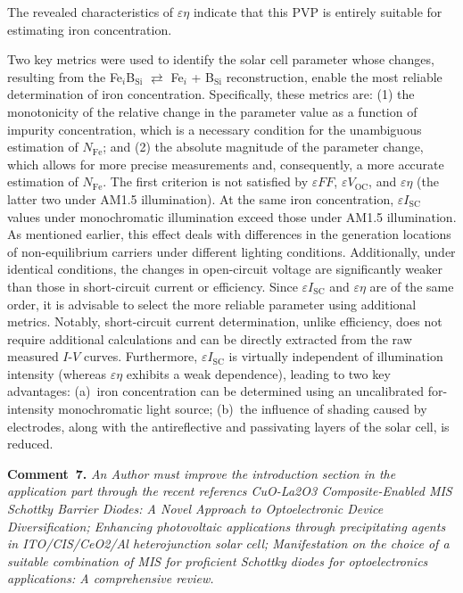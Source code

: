 \documentclass[a4paper,fleqn]{cas-sc}
\begin{document}
\begin{mdframed}
The revealed characteristics of $\varepsilon \eta$ indicate that this PVP
is entirely suitable for estimating iron concentration.

\textcolor[rgb]{1.00,0.07,0.00}{Two key metrics were used to identify the solar cell parameter whose changes,
resulting from the Fe$_i$B$_\mathrm{Si}$ $\rightleftarrows$ Fe$_i$ + B$_\mathrm{Si}$ reconstruction,
enable the most reliable determination of iron concentration.
Specifically, these metrics are:
(1) the monotonicity of the relative change in the parameter value as a function of impurity concentration,
which is a necessary condition for the unambiguous estimation of $N_\mathrm{Fe}$;
and (2) the absolute magnitude of the parameter change, which allows for more precise measurements and,
consequently, a more accurate estimation of $N_\mathrm{Fe}$.
The first criterion is not satisfied by $\varepsilon F\!F$, $\varepsilon V_\mathrm{OC}$, and $\varepsilon \eta$
(the latter two under AM1.5 illumination).
At the same iron concentration, $\varepsilon I_\mathrm{SC}$ values under monochromatic illumination exceed those under AM1.5 illumination.
As mentioned earlier, this effect deals with differences in the generation locations
of non-equilibrium carriers under different lighting conditions.
Additionally, under identical conditions, the changes in open-circuit voltage are significantly weaker
than those in short-circuit current or efficiency.
Since $\varepsilon I_\mathrm{SC}$ and $\varepsilon \eta$ are of the same order,
it is advisable to select the more reliable parameter using additional metrics.
Notably, short-circuit current determination, unlike efficiency, does not require additional calculations
and can be directly extracted from the raw measured $I$-$V$ curves.
Furthermore, $\varepsilon I_\mathrm{SC}$ is virtually independent of illumination intensity
(whereas $\varepsilon \eta$ exhibits a weak dependence), leading to two key advantages:
(a)~iron concentration can be determined using an uncalibrated for-intensity monochromatic light source;
(b)~the influence of shading caused by electrodes, along with the antireflective and passivating layers of the solar cell, is reduced.}

\end{mdframed}

\vspace{1cm}
\noindent
\textcolor[rgb]{0.00,0.50,1.00}{\textbf{Comment~7.}}
\emph{An Author must improve the introduction section in the application part through the recent referencs
CuO-La2O3 Composite-Enabled MIS Schottky Barrier Diodes: A Novel Approach to Optoelectronic Device Diversification;
Enhancing photovoltaic applications through precipitating agents in ITO/CIS/CeO2/Al heterojunction solar cell;
Manifestation on the choice of a suitable combination of MIS for proficient Schottky diodes for optoelectronics applications: A comprehensive review.}
\end{document}
